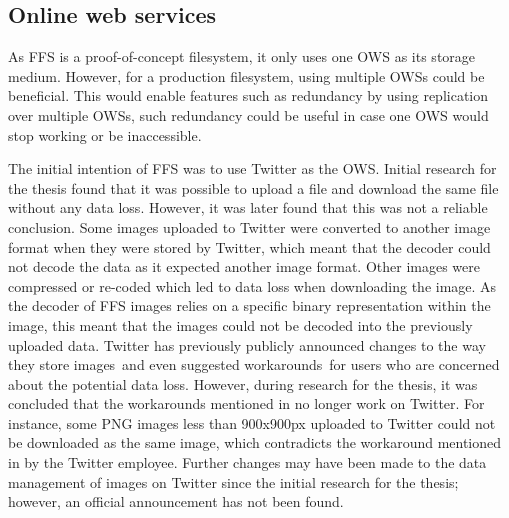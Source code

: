 \subsection{Online web services}
\label{subsec:ffs_ows}
As \gls{FFS} is a \mbox{proof-of-concept} filesystem, it only uses one \gls{OWS} as its storage medium. However, for a production filesystem, using multiple \glspl{OWS} could be beneficial. This would enable features such as redundancy by using replication over multiple \glspl{OWS}, such redundancy could be useful in case one \gls{OWS} would stop working or be inaccessible.

The initial intention of \gls{FFS} was to use Twitter as the \gls{OWS}. Initial research for the thesis found that it was possible to upload a file and download the same file without any data loss. However, it was later found that this was not a reliable conclusion. Some images uploaded to Twitter were converted to another image format when they were stored by Twitter, which meant that the decoder could not decode the data as it expected another image format. Other images were compressed or \mbox{re-coded} which led to data loss when downloading the image. As the decoder of \gls{FFS} images relies on a specific binary representation within the image, this meant that the images could not be decoded into the previously uploaded data. Twitter has previously publicly announced changes to the way they store images\,\cite{nolanobrienUpcomingChangesPNG2018} and even suggested workarounds\,\cite{nolanobrienFeedbackUpcomingChanges2019} for users who are concerned about the potential data loss. However, during research for the thesis, it was concluded that the workarounds mentioned in \cite{nolanobrienFeedbackUpcomingChanges2019} no longer work on Twitter. For instance, some PNG images less than 900x900px uploaded to Twitter could not be downloaded as the same image, which contradicts the workaround mentioned in \cite{nolanobrienFeedbackUpcomingChanges2019} by the Twitter employee. Further changes may have been made to the data management of images on Twitter since the initial research for the thesis; however, an official announcement has not been found.

